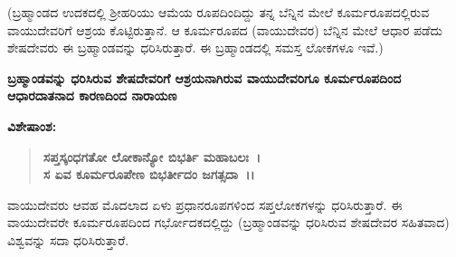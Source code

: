 (ಬ್ರಹ್ಮಾಂಡದ ಉದಕದಲ್ಲಿ ಶ‍್ರೀಹರಿಯು ಆಮೆಯ ರೂಪದಿಂದಿದ್ದು ತನ್ನ ಬೆನ್ನಿನ ಮೇಲೆ ಕೂರ್ಮರೂಪದಲ್ಲಿರುವ ವಾಯುದೇವರಿಗೆ ಆಶ್ರಯ ಕೊಟ್ಟಿರುತ್ತಾನೆ. ಆ ಕೂರ್ಮರೂಪದ (ವಾಯುದೇವರ) ಬೆನ್ನಿನ ಮೇಲೆ ಆಧಾರ ಪಡೆದು ಶೇಷದೇವರು ಈ ಬ್ರಹ್ಮಾಂಡವನ್ನು ಧರಿಸಿರುತ್ತಾರೆ. ಈ ಬ್ರಹ್ಮಾಂಡದಲ್ಲಿ ಸಮಸ್ತ ಲೋಕಗಳೂ ಇವೆ.)

\newpage

\begin{center}
\textbf{ಬ್ರಹ್ಮಾಂಡವನ್ನು ಧರಿಸಿರುವ ಶೇಷದೇವರಿಗೆ ಆಶ್ರಯನಾಗಿರುವ ವಾಯುದೇವರಿಗೂ ಕೂರ್ಮರೂಪದಿಂದ ಆಧಾರದಾತನಾದ ಕಾರಣದಿಂದ ನಾರಾಯಣ}
\end{center}

\noindent
\textbf{ವಿಶೇಷಾಂಶ:\enginline{-}}

\begin{verse}
\textbf{ಸಪ್ತಸ್ಕಂಧಗತೋ ಲೋಕಾನ್ಯೋ ಬಿಭರ್ತಿ ಮಹಾಬಲಃ~।}\\\textbf{ಸ ಏವ ಕೂರ್ಮರೂಪೇಣ ಬಿಭರ್ತೀದಂ ಜಗತ್ಸದಾ~।।}
\end{verse}


ವಾಯುದೇವರು ಆವಹ ಮೊದಲಾದ ಏಳು ಪ್ರಧಾನರೂಪಗಳಿಂದ ಸಪ್ತಲೋಕಗಳನ್ನು ಧರಿಸಿರುತ್ತಾರೆ. ಈ ವಾಯುದೇವರೇ ಕೂರ್ಮರೂಪದಿಂದ ಗರ್ಭೋದಕದಲ್ಲಿದ್ದು (ಬ್ರಹ್ಮಾಂಡವನ್ನು ಧರಿಸಿರುವ ಶೇಷದೇವರ ಸಹಿತವಾದ) ವಿಶ್ವವನ್ನು ಸದಾ ಧರಿಸಿರುತ್ತಾರೆ.

